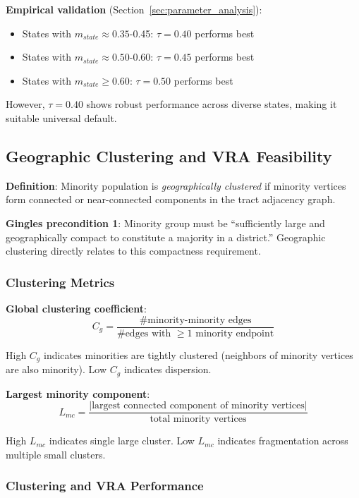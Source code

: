 \textbf{Empirical validation} (Section~\ref{sec:parameter_analysis}):
\begin{itemize}
\item States with $m_{state} \approx 0.35$-0.45: $\tau = 0.40$ performs best
\item States with $m_{state} \approx 0.50$-0.60: $\tau = 0.45$ performs best
\item States with $m_{state} \geq 0.60$: $\tau = 0.50$ performs best
\end{itemize}

However, $\tau = 0.40$ shows robust performance across diverse states, making it suitable universal default.

\subsection{Geographic Clustering and VRA Feasibility}

\textbf{Definition}: Minority population is \textit{geographically clustered} if minority vertices form connected or near-connected components in the tract adjacency graph.

\textbf{Gingles precondition 1}: Minority group must be ``sufficiently large and geographically compact to constitute a majority in a district.'' Geographic clustering directly relates to this compactness requirement.

\subsubsection{Clustering Metrics}

\textbf{Global clustering coefficient}:
\begin{equation}
C_g = \frac{\text{\# minority-minority edges}}{\text{\# edges with $\geq 1$ minority endpoint}}
\end{equation}

High $C_g$ indicates minorities are tightly clustered (neighbors of minority vertices are also minority). Low $C_g$ indicates dispersion.

\textbf{Largest minority component}:
\begin{equation}
L_{mc} = \frac{|\text{largest connected component of minority vertices}|}{\text{total minority vertices}}
\end{equation}

High $L_{mc}$ indicates single large cluster. Low $L_{mc}$ indicates fragmentation across multiple small clusters.

\subsubsection{Clustering and VRA Performance}

